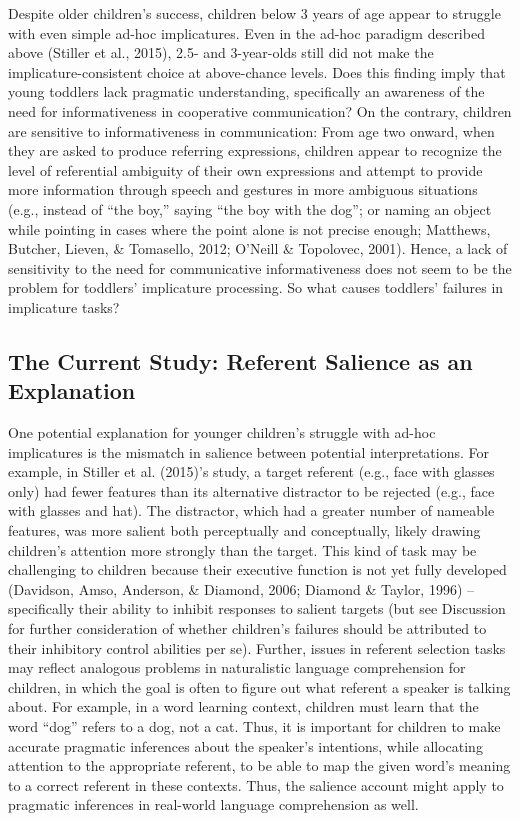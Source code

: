 \documentclass[man]{apa6}
\theoremstyle{definition}
\theoremstyle{definition}
\theoremstyle{definition}
\theoremstyle{remark}
\begin{document}
Despite older children's success, children below 3 years of age appear
to struggle with even simple ad-hoc implicatures. Even in the ad-hoc
paradigm described above (Stiller et al., 2015), 2.5- and 3-year-olds
still did not make the implicature-consistent choice at above-chance
levels. Does this finding imply that young toddlers lack pragmatic
understanding, specifically an awareness of the need for informativeness
in cooperative communication? On the contrary, children are sensitive to
informativeness in communication: From age two onward, when they are
asked to produce referring expressions, children appear to recognize the
level of referential ambiguity of their own expressions and attempt to
provide more information through speech and gestures in more ambiguous
situations (e.g., instead of ``the boy,'' saying ``the boy with the
dog''; or naming an object while pointing in cases where the point alone
is not precise enough; Matthews, Butcher, Lieven, \& Tomasello, 2012;
O'Neill \& Topolovec, 2001). Hence, a lack of sensitivity to the need
for communicative informativeness does not seem to be the problem for
toddlers' implicature processing. So what causes toddlers' failures in
implicature tasks?

\subsection{The Current Study: Referent Salience as an
Explanation}\label{the-current-study-referent-salience-as-an-explanation}

One potential explanation for younger children's struggle with ad-hoc
implicatures is the mismatch in salience between potential
interpretations. For example, in Stiller et al. (2015)'s study, a target
referent (e.g., face with glasses only) had fewer features than its
alternative distractor to be rejected (e.g., face with glasses and hat).
The distractor, which had a greater number of nameable features, was
more salient both perceptually and conceptually, likely drawing
children's attention more strongly than the target. This kind of task
may be challenging to children because their executive function is not
yet fully developed (Davidson, Amso, Anderson, \& Diamond, 2006; Diamond
\& Taylor, 1996) -- specifically their ability to inhibit responses to
salient targets (but see Discussion for further consideration of whether
children's failures should be attributed to their inhibitory control
abilities per se). Further, issues in referent selection tasks may
reflect analogous problems in naturalistic language comprehension for
children, in which the goal is often to figure out what referent a
speaker is talking about. For example, in a word learning context,
children must learn that the word \enquote{dog} refers to a dog, not a
cat. Thus, it is important for children to make accurate pragmatic
inferences about the speaker's intentions, while allocating attention to
the appropriate referent, to be able to map the given word's meaning to
a correct referent in these contexts. Thus, the salience account might
apply to pragmatic inferences in real-world language comprehension as
well.
\end{document}
